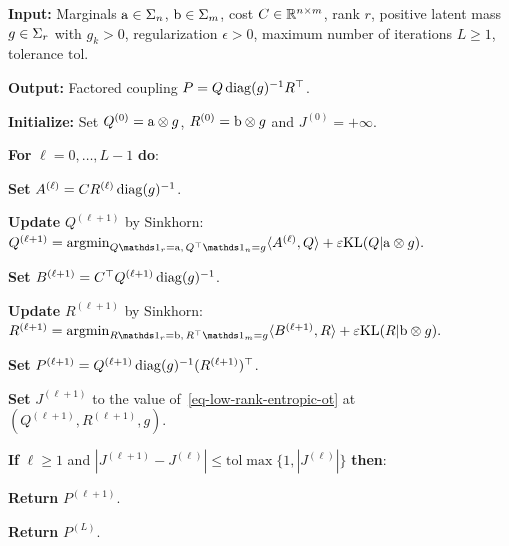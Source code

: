 \begin{algH}\label{alg-low-rank-sinkhorn-fixed-g}
\textbf{Input:} Marginals $\mathrm{a}\in\Sigma_n$, $\mathrm{b}\in\Sigma_m$, cost $C\in\mathbb{R}^{n\times m}$, rank $r$, positive latent mass $g\in\Sigma_r$ with $g_k>0$, regularization $\epsilon>0$, maximum number of iterations $L\geq1$, tolerance $\mathrm{tol}$.

\textbf{Output:} Factored coupling $P=Q\operatorname{diag}(g)^{-1}R^\top$.

\textbf{Initialize:} Set $Q^{(0)}=\mathrm{a}\otimes g$, $R^{(0)}=\mathrm{b}\otimes g$ and $J^{(0)}=+\infty$.

\textbf{For} $\ell=0,\ldots,L-1$ \textbf{do}:
\begin{algblock}
\textbf{Set} $A^{(\ell)}=C R^{(\ell)}\operatorname{diag}(g)^{-1}$.

\textbf{Update} $Q^{(\ell+1)}$ by Sinkhorn:
\(Q^{(\ell+1)}=\argmin_{Q\ones_r=\a,\,Q^\top\ones_n=g}\langle A^{(\ell)},Q\rangle+\epsilon\KLD(Q|\a\otimes g).\)

\textbf{Set} $B^{(\ell+1)}=C^\top Q^{(\ell+1)}\operatorname{diag}(g)^{-1}$.

\textbf{Update} $R^{(\ell+1)}$ by Sinkhorn:
\(R^{(\ell+1)}=\argmin_{R\ones_r=\b,\,R^\top\ones_m=g}\langle B^{(\ell+1)},R\rangle+\epsilon\KLD(R|\b\otimes g).\)

\textbf{Set} $P^{(\ell+1)}=Q^{(\ell+1)}\operatorname{diag}(g)^{-1}(R^{(\ell+1)})^\top$.

\textbf{Set} $J^{(\ell+1)}$ to the value of~\eqref{eq-low-rank-entropic-ot} at $(Q^{(\ell+1)},R^{(\ell+1)},g)$.

\textbf{If} $\ell\geq1$ and $|J^{(\ell+1)}-J^{(\ell)}|\leq \mathrm{tol}\max\{1,|J^{(\ell)}|\}$ \textbf{then}:
\begin{algblock}
\textbf{Return} $P^{(\ell+1)}$.
\end{algblock}
\end{algblock}

\textbf{Return} $P^{(L)}$.
\end{algH}

